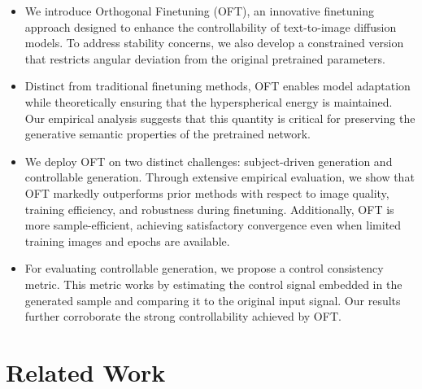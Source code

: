 \begin{itemize}[leftmargin=*,nosep]

    \item We introduce Orthogonal Finetuning (OFT), an innovative finetuning approach designed to enhance the controllability of text-to-image diffusion models. To address stability concerns, we also develop a constrained version that restricts angular deviation from the original pretrained parameters.
    \item Distinct from traditional finetuning methods, OFT enables model adaptation while theoretically ensuring that the hyperspherical energy is maintained. Our empirical analysis suggests that this quantity is critical for preserving the generative semantic properties of the pretrained network.
    \item We deploy OFT on two distinct challenges: subject-driven generation and controllable generation. Through extensive empirical evaluation, we show that OFT markedly outperforms prior methods with respect to image quality, training efficiency, and robustness during finetuning. Additionally, OFT is more sample-efficient, achieving satisfactory convergence even when limited training images and epochs are available.
    \item For evaluating controllable generation, we propose a control consistency metric. This metric works by estimating the control signal embedded in the generated sample and comparing it to the original input signal. Our results further corroborate the strong controllability achieved by OFT.
\end{itemize}

\section{Related Work}

